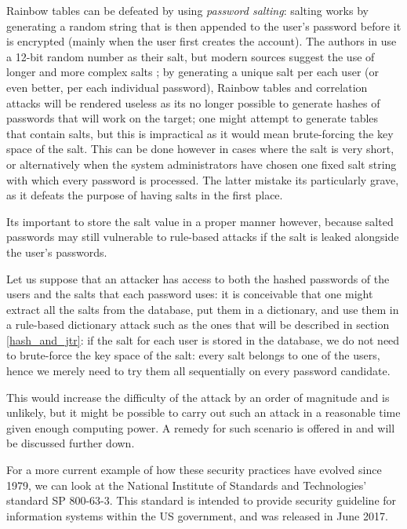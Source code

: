 Rainbow tables can be defeated by using \emph{password salting}: salting works by generating a random string that is then appended to the user's password before it is encrypted (mainly when the user first creates the account). The authors in \cite{Thompson1979} use a 12-bit random number as their salt, but modern sources suggest the use of longer and more complex salts \cite{NIST_2017}; by generating a unique salt per each user (or even better, per each individual password), Rainbow tables and correlation attacks will be rendered useless as its no longer possible to generate hashes of passwords that will work on the target; one might attempt to generate tables that contain salts, but this is impractical as it would mean brute-forcing the key space of the salt.
This can be done however in cases where the salt is very short, or alternatively when the system administrators have chosen one fixed salt string with which every password is processed.
The latter mistake its particularly grave, as it defeats the purpose of having salts in the first place.
   
Its important to store the salt value in a proper manner however, because salted passwords may still vulnerable to rule-based attacks if the salt is leaked alongside the user's passwords. \newline

Let us suppose that an attacker has access to both the hashed passwords of the users and the salts that each password uses: it is conceivable that one might extract all the salts from the database, put them in a dictionary, and use them in a rule-based dictionary attack such as the ones that will be described in section \ref{hash_and_jtr}: if the salt for each user is stored in the database, we do not need to brute-force the key space of the salt: every salt belongs to one of the users, hence we merely need to try them all sequentially on every password candidate. 

This would increase the difficulty of the attack by an order of magnitude and is unlikely, but it might be possible to carry out such an attack in a reasonable time given enough computing power. A remedy for such scenario is offered in \cite{NIST_2017} and will be discussed further down. %

For a more current example of how these security practices have evolved since 1979, we can look at the National Institute of Standards and Technologies' standard SP 800-63-3.
This standard is intended to provide security guideline for information systems within the US government, and was released in June 2017.


